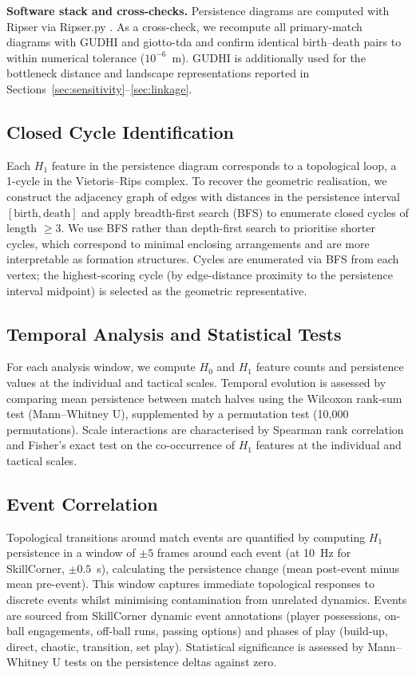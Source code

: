 \textbf{Software stack and cross-checks.} Persistence diagrams are computed with Ripser via Ripser.py \citep{Bauer2021,Tralie2018}. As a cross-check, we recompute all primary-match diagrams with GUDHI and giotto-tda \citep{Tauzin2021} and confirm identical birth--death pairs to within numerical tolerance ($10^{-6}$~m). GUDHI is additionally used for the bottleneck distance and landscape representations reported in Sections~\ref{sec:sensitivity}--\ref{sec:linkage}.

\subsection{Closed Cycle Identification}

Each \(H_1\) feature in the persistence diagram corresponds to a topological loop, a 1-cycle in the Vietoris--Rips complex. To recover the geometric realisation, we construct the adjacency graph of edges with distances in the persistence interval \([\text{birth},\text{death}]\) and apply breadth-first search (BFS) to enumerate closed cycles of length \(\geq 3\). We use BFS rather than depth-first search to prioritise shorter cycles, which correspond to minimal enclosing arrangements and are more interpretable as formation structures. Cycles are enumerated via BFS from each vertex; the highest-scoring cycle (by edge-distance proximity to the persistence interval midpoint) is selected as the geometric representative.

\subsection{Temporal Analysis and Statistical Tests}

For each analysis window, we compute \(H_0\) and \(H_1\) feature counts and persistence values at the individual and tactical scales. Temporal evolution is assessed by comparing mean persistence between match halves using the Wilcoxon rank-sum test (Mann--Whitney U), supplemented by a permutation test (10,000 permutations). Scale interactions are characterised by Spearman rank correlation and Fisher's exact test on the co-occurrence of \(H_1\) features at the individual and tactical scales.

\subsection{Event Correlation}

Topological transitions around match events are quantified by computing \(H_1\) persistence in a window of \(\pm 5\) frames around each event (at 10~Hz for SkillCorner, \(\pm 0.5\)~s), calculating the persistence change (mean post-event minus mean pre-event). This window captures immediate topological responses to discrete events whilst minimising contamination from unrelated dynamics. Events are sourced from SkillCorner dynamic event annotations (player possessions, on-ball engagements, off-ball runs, passing options) and phases of play (build-up, direct, chaotic, transition, set play). Statistical significance is assessed by Mann--Whitney U tests on the persistence deltas against zero.
